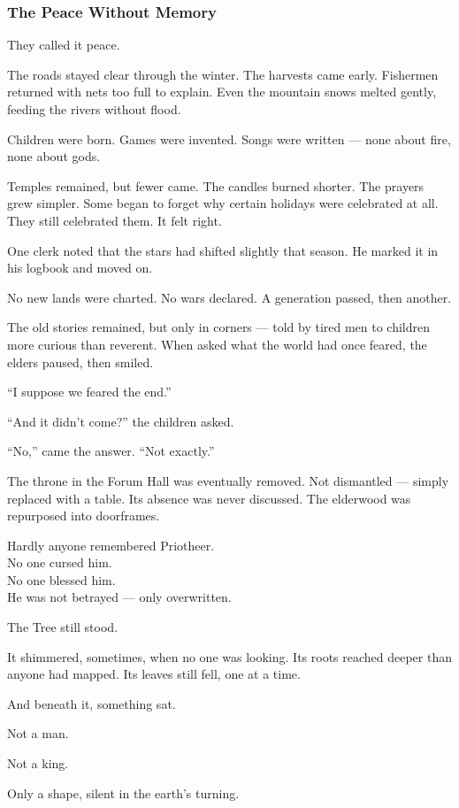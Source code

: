 \documentclass[12pt]{article}
\begin{document}
\subsubsection*{The Peace Without Memory}

They called it peace.

The roads stayed clear through the winter. The harvests came early. Fishermen returned with nets too full to explain. Even the mountain snows melted gently, feeding the rivers without flood.

Children were born. Games were invented. Songs were written — none about fire, none about gods.

Temples remained, but fewer came. The candles burned shorter. The prayers grew simpler. Some began to forget why certain holidays were celebrated at all. They still celebrated them. It felt right.

One clerk noted that the stars had shifted slightly that season. He marked it in his logbook and moved on.

No new lands were charted. No wars declared. A generation passed, then another.

The old stories remained, but only in corners — told by tired men to children more curious than reverent. When asked what the world had once feared, the elders paused, then smiled.

``I suppose we feared the end.''

``And it didn’t come?'' the children asked.

``No,'' came the answer. ``Not exactly.''

The throne in the Forum Hall was eventually removed. Not dismantled — simply replaced with a table. Its absence was never discussed. The elderwood was repurposed into doorframes.

Hardly anyone remembered Priotheer.\\
No one cursed him.\\
No one blessed him.\\
He was not betrayed — only overwritten.

The Tree still stood.

It shimmered, sometimes, when no one was looking. Its roots reached deeper than anyone had mapped. Its leaves still fell, one at a time.

And beneath it, something sat.

Not a man.

Not a king.

Only a shape, silent in the earth’s turning.
\end{document}
